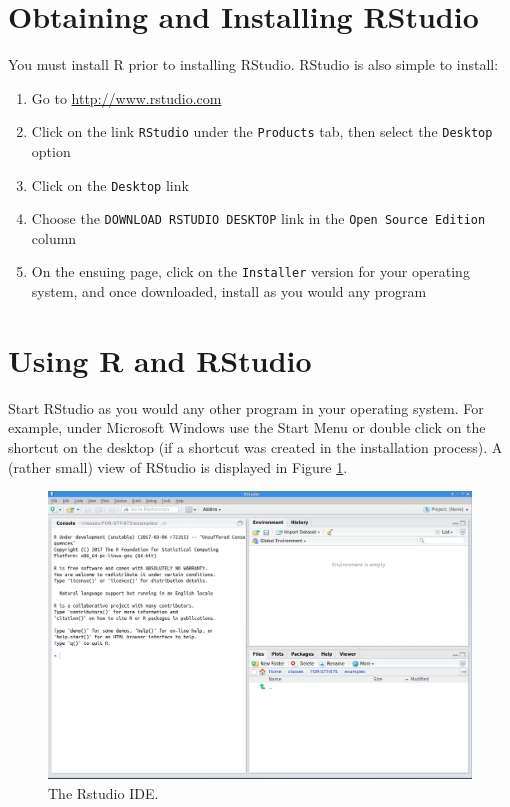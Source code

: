 \documentclass[]{krantz}
\providecommand{\tightlist}{%
  \setlength{\itemsep}{0pt}\setlength{\parskip}{0pt}}
\theoremstyle{definition}
\theoremstyle{definition}
\theoremstyle{definition}
\theoremstyle{remark}
\begin{document}
\section{Obtaining and Installing
RStudio}\label{obtaining-and-installing-rstudio}

You must install R prior to installing RStudio. RStudio is also simple
to install:

\begin{enumerate}
\def\labelenumi{\arabic{enumi}.}
\tightlist
\item
  Go to \url{http://www.rstudio.com}
\item
  Click on the link \texttt{RStudio} under the \texttt{Products} tab,
  then select the \texttt{Desktop} option
\item
  Click on the \texttt{Desktop} link
\item
  Choose the \texttt{DOWNLOAD\ RSTUDIO\ DESKTOP} link in the
  \texttt{Open\ Source\ Edition} column
\item
  On the ensuing page, click on the \texttt{Installer} version for your
  operating system, and once downloaded, install as you would any
  program
\end{enumerate}

\section{Using R and RStudio}\label{using-r-and-rstudio}

Start RStudio as you would any other program in your operating system.
For example, under Microsoft Windows use the Start Menu or double click
on the shortcut on the desktop (if a shortcut was created in the
installation process). A (rather small) view of RStudio is displayed in
Figure \ref{fig:rstudio}.

\begin{figure}
\includegraphics[width=20.75in]{02-introToR/02-images/RStudio} \caption{The Rstudio IDE.}\label{fig:rstudio}
\end{figure}
\end{document}
